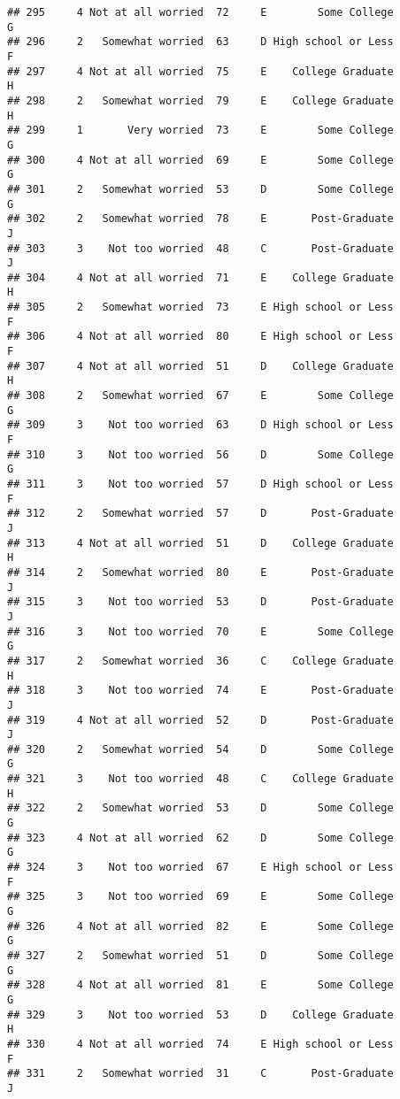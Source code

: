 \documentclass[
]{article}
\begin{document}
\begin{verbatim}
## 295     4 Not at all worried  72     E        Some College         G
## 296     2   Somewhat worried  63     D High school or Less         F
## 297     4 Not at all worried  75     E    College Graduate         H
## 298     2   Somewhat worried  79     E    College Graduate         H
## 299     1       Very worried  73     E        Some College         G
## 300     4 Not at all worried  69     E        Some College         G
## 301     2   Somewhat worried  53     D        Some College         G
## 302     2   Somewhat worried  78     E       Post-Graduate         J
## 303     3    Not too worried  48     C       Post-Graduate         J
## 304     4 Not at all worried  71     E    College Graduate         H
## 305     2   Somewhat worried  73     E High school or Less         F
## 306     4 Not at all worried  80     E High school or Less         F
## 307     4 Not at all worried  51     D    College Graduate         H
## 308     2   Somewhat worried  67     E        Some College         G
## 309     3    Not too worried  63     D High school or Less         F
## 310     3    Not too worried  56     D        Some College         G
## 311     3    Not too worried  57     D High school or Less         F
## 312     2   Somewhat worried  57     D       Post-Graduate         J
## 313     4 Not at all worried  51     D    College Graduate         H
## 314     2   Somewhat worried  80     E       Post-Graduate         J
## 315     3    Not too worried  53     D       Post-Graduate         J
## 316     3    Not too worried  70     E        Some College         G
## 317     2   Somewhat worried  36     C    College Graduate         H
## 318     3    Not too worried  74     E       Post-Graduate         J
## 319     4 Not at all worried  52     D       Post-Graduate         J
## 320     2   Somewhat worried  54     D        Some College         G
## 321     3    Not too worried  48     C    College Graduate         H
## 322     2   Somewhat worried  53     D        Some College         G
## 323     4 Not at all worried  62     D        Some College         G
## 324     3    Not too worried  67     E High school or Less         F
## 325     3    Not too worried  69     E        Some College         G
## 326     4 Not at all worried  82     E        Some College         G
## 327     2   Somewhat worried  51     D        Some College         G
## 328     4 Not at all worried  81     E        Some College         G
## 329     3    Not too worried  53     D    College Graduate         H
## 330     4 Not at all worried  74     E High school or Less         F
## 331     2   Somewhat worried  31     C       Post-Graduate         J

\end{verbatim}
\end{document}
